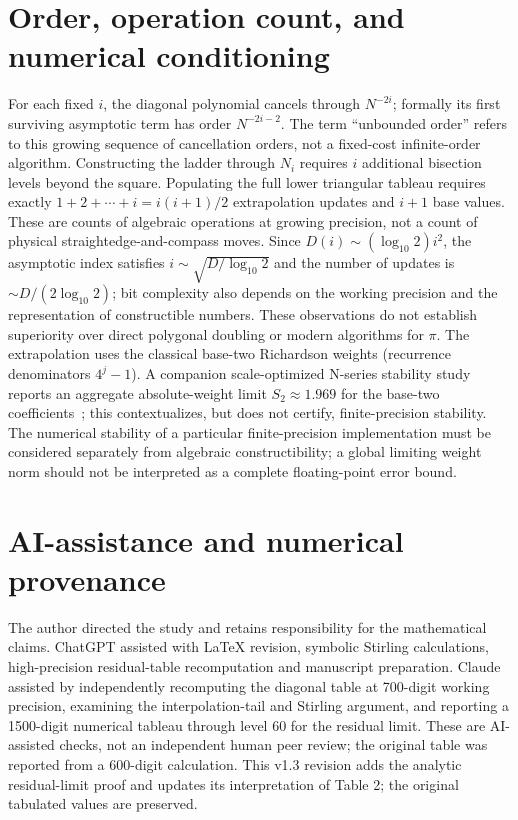 \documentclass[11pt]{article}
\begin{document}
\section{Order, operation count, and numerical conditioning}
For each fixed $i$, the diagonal polynomial cancels through $N^{-2i}$; formally its first surviving asymptotic term has order $N^{-2i-2}$. The term ``unbounded order'' refers to this growing sequence of cancellation orders, not a fixed-cost infinite-order algorithm.
Constructing the ladder through $N_i$ requires $i$ additional bisection levels beyond the square. Populating the full lower triangular tableau requires exactly $1+2+\cdots+i=i(i+1)/2$ extrapolation updates and $i+1$ base values. These are counts of algebraic operations at growing precision, not a count of physical straightedge-and-compass moves. Since $D(i)\sim(\log_{10}2)i^2$, the asymptotic index satisfies $i\sim\sqrt{D/\log_{10}2}$ and the number of updates is $\sim D/(2\log_{10}2)$; bit complexity also depends on the working precision and the representation of constructible numbers. These observations do not establish superiority over direct polygonal doubling or modern algorithms for $\pi$.
The extrapolation uses the classical base-two Richardson weights (recurrence denominators $4^j-1$). A companion scale-optimized N-series stability study reports an aggregate absolute-weight limit $S_2\approx1.969$ for the base-two coefficients~\cite{bakerstability}; this contextualizes, but does not certify, finite-precision stability. The numerical stability of a particular finite-precision implementation must be considered separately from algebraic constructibility; a global limiting weight norm should not be interpreted as a complete floating-point error bound.
\section{AI-assistance and numerical provenance}
The author directed the study and retains responsibility for the mathematical claims. ChatGPT assisted with LaTeX revision, symbolic Stirling calculations, high-precision residual-table recomputation and manuscript preparation. Claude assisted by independently recomputing the diagonal table at 700-digit working precision, examining the interpolation-tail and Stirling argument, and reporting a 1500-digit numerical tableau through level 60 for the residual limit. These are AI-assisted checks, not an independent human peer review; the original table was reported from a 600-digit calculation. This v1.3 revision adds the analytic residual-limit proof and updates its interpretation of Table 2; the original tabulated values are preserved.
\end{document}
